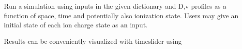 \documentclass[letterpaper,10pt,english]{sphinxmanual}
\begin{document}
\begin{fulllineitems}
\begin{fulllineitems}
\label{\detokenize{aurora:aurora.core.aurora_sim.run_aurora}}
Run a simulation using inputs in the given dictionary and D,v profiles as a function
of space, time and potentially also ionization state. Users may give an initial state of each
ion charge state as an input.

Results can be conveniently visualized with time\sphinxhyphen{}slider using


\end{fulllineitems}
\end{fulllineitems}
\end{document}
